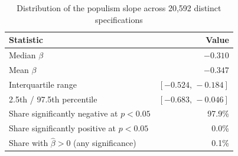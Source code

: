 \begin{table}[ht]
\centering
\caption{Distribution of the populism slope across 20,592 distinct specifications}
\label{tab:speccurve:headline}
\footnotesize
\begin{tabular}{lr}
\toprule
Statistic & Value \\
\midrule
Median $\beta$ & $-0.310$ \\
Mean $\beta$ & $-0.347$ \\
Interquartile range & $[-0.524,\,-0.184]$ \\
2.5th / 97.5th percentile & $[-0.683,\,-0.046]$ \\
Share significantly negative at $p<0.05$ & 97.9\% \\
Share significantly positive at $p<0.05$ & 0.0\% \\
Share with $\hat{\beta}>0$ (any significance) & 0.1\% \\
\bottomrule
\end{tabular}
\end{table}
